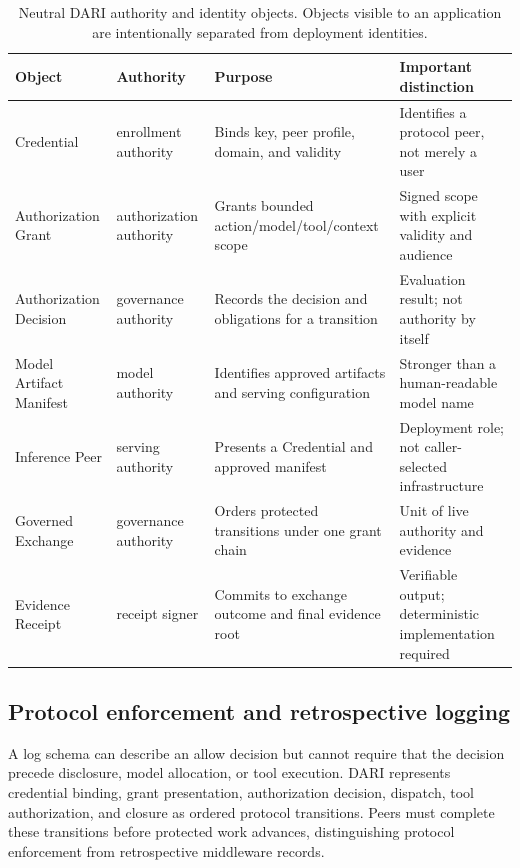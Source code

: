 \documentclass[10pt]{article}
\begin{document}
\begin{table}[t]
\centering
\caption{Neutral DARI authority and identity objects. Objects visible to an application are intentionally separated from deployment identities.}
\label{tab:objects}
\small
\begin{tabularx}{\textwidth}{@{}l l Y Y@{}}
\toprule
Object & Authority & Purpose & Important distinction \\
\midrule
Credential & enrollment authority & Binds key, peer profile, domain, and validity & Identifies a protocol peer, not merely a user \\
Authorization Grant & authorization authority & Grants bounded action/model/tool/context scope & Signed scope with explicit validity and audience \\
Authorization Decision & governance authority & Records the decision and obligations for a transition & Evaluation result; not authority by itself \\
Model Artifact Manifest & model authority & Identifies approved artifacts and serving configuration & Stronger than a human-readable model name \\
Inference Peer & serving authority & Presents a Credential and approved manifest & Deployment role; not caller-selected infrastructure \\
Governed Exchange & governance authority & Orders protected transitions under one grant chain & Unit of live authority and evidence \\
Evidence Receipt & receipt signer & Commits to exchange outcome and final evidence root & Verifiable output; deterministic implementation required \\
\bottomrule
\end{tabularx}
\end{table}

\subsection{Protocol enforcement and retrospective logging}

A log schema can describe an allow decision but cannot require that the decision precede disclosure, model allocation, or tool execution. DARI represents credential binding, grant presentation, authorization decision, dispatch, tool authorization, and closure as ordered protocol transitions. Peers must complete these transitions before protected work advances, distinguishing protocol enforcement from retrospective middleware records.
\end{document}
